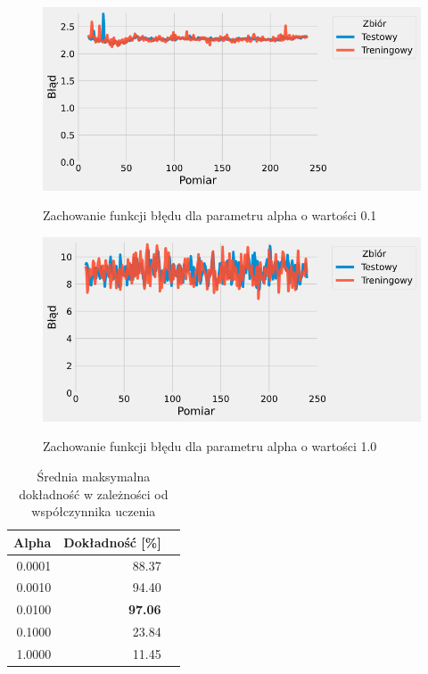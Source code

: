 \documentclass{article}
\begin{document}
\begin{figure}[H]
	\centering
	\caption{Zachowanie funkcji błędu dla parametru alpha o wartości 0.1}
	\includegraphics[width=\textwidth]{alpha_err_01.png}
	\label{fig:res46}
\end{figure}
\begin{figure}[H]
	\centering
	\caption{Zachowanie funkcji błędu dla parametru alpha o wartości 1.0}
	\includegraphics[width=\textwidth]{alpha_err_1.png}
	\label{fig:res47}
\end{figure}


\begin{table}[H]
	\caption{Średnia maksymalna dokładność w zależności od współczynnika uczenia}
	\label{tabela-res-41}
	\centering
	\begin{tabular}{rrr}
		\toprule
		Alpha  & Dokładność [\%] \\
		\midrule
		0.0001 & 88.37              \\
		0.0010 & 94.40              \\
		0.0100 & \textbf{97.06}     \\
		0.1000 & 23.84              \\
		1.0000 & 11.45              \\
		\bottomrule
	\end{tabular}
\end{table}
\end{document}
